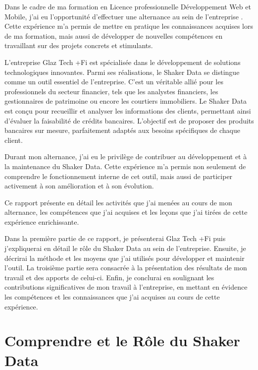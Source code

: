 \documentclass[12pt,oneside,noprintercorrection]{iut}
\begin{document}
Dans le cadre de ma formation en Licence professionnelle Développement Web et Mobile, j'ai eu l'opportunité d'effectuer une alternance au sein de l'entreprise \glaz{}. Cette expérience m'a permis de mettre en pratique les connaissances acquises lors de ma formation, mais aussi de développer de nouvelles compétences en travaillant sur des projets concrets et stimulants.

L'entreprise Glaz Tech +Fi est spécialisée dans le développement de solutions technologiques innovantes. Parmi ses réalisations, le Shaker Data se distingue comme un outil essentiel de l'entreprise. C'est un véritable allié pour les professionnels du secteur financier, tels que les analystes financiers, les gestionnaires de patrimoine ou encore les courtiers immobiliers. Le Shaker Data est conçu pour recueillir et analyser les informations des clients, permettant ainsi d'évaluer la faisabilité de crédits bancaires. L'objectif est de proposer des produits bancaires sur mesure, parfaitement adaptés aux besoins spécifiques de chaque client.

Durant mon alternance, j'ai eu le privilège de contribuer au développement et à la maintenance du Shaker Data. Cette expérience m'a permis non seulement de comprendre le fonctionnement interne de cet outil, mais aussi de participer activement à son amélioration et à son évolution.

Ce rapport présente en détail les activités que j'ai menées au cours de mon alternance, les compétences que j'ai acquises et les leçons que j'ai tirées de cette expérience enrichissante.

Dans la première partie de ce rapport, je présenterai Glaz Tech +Fi puis j'expliquerai en détail le rôle du Shaker Data au sein de l'entreprise. Ensuite, je décrirai la méthode et les moyens que j'ai utilisés pour développer et maintenir l'outil. La troisième partie sera consacrée à la présentation des résultats de mon travail et des apports de celui-ci. Enfin, je conclurai en soulignant les contributions significatives de mon travail à l'entreprise, en mettant en évidence les compétences et les connaissances que j'ai acquises au cours de cette expérience.

\NoChapterHead

\chapter{Comprendre \glaz{} et le Rôle du Shaker Data}
\end{document}
